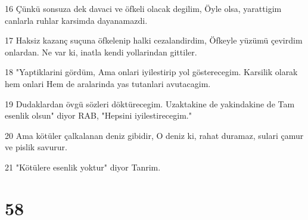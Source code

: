 \par 16 Çünkü sonsuza dek davaci ve öfkeli olacak degilim, Öyle olsa, yarattigim canlarla ruhlar karsimda dayanamazdi.
\par 17 Haksiz kazanç suçuna öfkelenip halki cezalandirdim, Öfkeyle yüzümü çevirdim onlardan. Ne var ki, inatla kendi yollarindan gittiler.
\par 18 "Yaptiklarini gördüm, Ama onlari iyilestirip yol gösterecegim. Karsilik olarak hem onlari Hem de aralarinda yas tutanlari avutacagim.
\par 19 Dudaklardan övgü sözleri döktürecegim. Uzaktakine de yakindakine de Tam esenlik olsun" diyor RAB, "Hepsini iyilestirecegim."
\par 20 Ama kötüler çalkalanan deniz gibidir, O deniz ki, rahat duramaz, sulari çamur ve pislik savurur.
\par 21 "Kötülere esenlik yoktur" diyor Tanrim.

\chapter{58}

